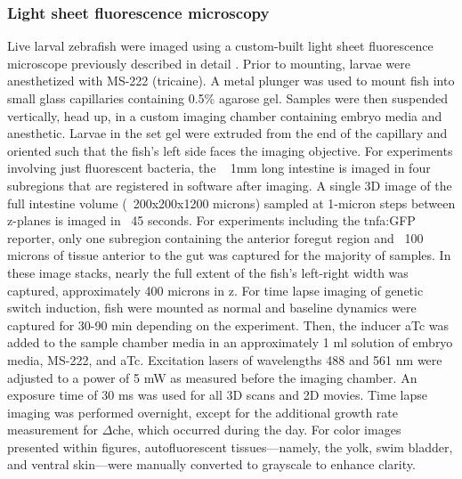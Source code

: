{{{{{{{\subsubsection{Light sheet fluorescence microscopy}
Live larval zebrafish were imaged using a custom-built light sheet fluorescence microscope previously described in detail \cite{jemielita_spatial_2014}. Prior to mounting, larvae were anesthetized with MS-222 (tricaine). A metal plunger was used to mount fish into small glass capillaries containing 0.5\% agarose gel. Samples were then suspended vertically, head up, in a custom imaging chamber containing embryo media and anesthetic. Larvae in the set gel were extruded from the end of the capillary and oriented such that the fish's left side faces the imaging objective. For experiments involving just fluorescent bacteria, the ~ 1mm long intestine is imaged in four subregions that are registered in software after imaging. A single 3D image of the full intestine volume (~200x200x1200 microns) sampled at 1-micron steps between z-planes is imaged in ~45 seconds. For experiments including the tnfa:GFP reporter, only one subregion containing the anterior foregut region and ~100 microns of tissue anterior to the gut was captured for the majority of samples. In these image stacks, nearly the full extent of the fish's left-right width was captured, approximately 400 microns in z. For time lapse imaging of genetic switch induction, fish were mounted as normal and baseline dynamics were captured for 30-90 min depending on the experiment. Then, the inducer aTc was added to the sample chamber media in an approximately 1 ml solution of embryo media, MS-222, and aTc. Excitation lasers of wavelengths 488 and 561 nm were adjusted to a power of 5 mW as measured before the imaging chamber. An exposure time of 30 ms was used for all 3D scans and 2D movies. Time lapse imaging was performed overnight, except for the additional growth rate measurement for $\Delta$che, which occurred during the day. For color images presented within figures, autofluorescent tissues—namely, the yolk, swim bladder, and ventral skin—were manually converted to grayscale to enhance clarity.

}}}}}}}
